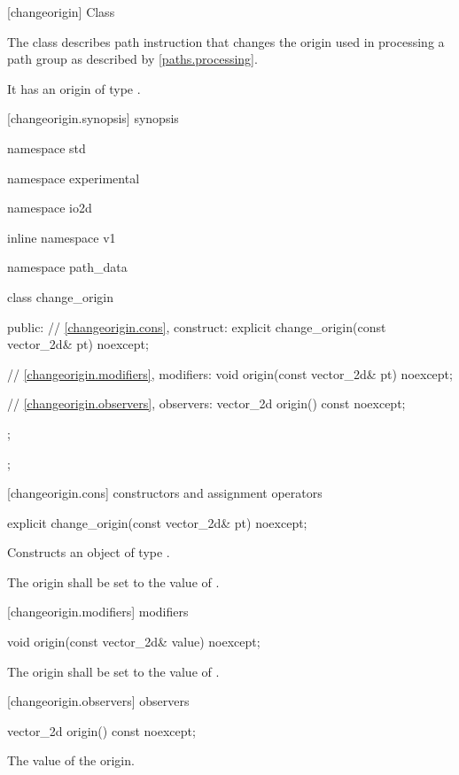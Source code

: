  [changeorigin] {Class }

\pnum
{}
The class  describes path instruction that changes the origin used in processing a path group as described by \ref{paths.processing}.

\pnum
It has an origin of type .

 [changeorigin.synopsis] { synopsis}

\begin{codeblock}
namespace std { namespace experimental { namespace io2d { inline namespace v1 {
  namespace path_data {
    class change_origin {
    public:
      // \ref{changeorigin.cons}, construct:
      explicit change_origin(const vector_2d& pt) noexcept;

      // \ref{changeorigin.modifiers}, modifiers:
      void origin(const vector_2d& pt) noexcept;

      // \ref{changeorigin.observers}, observers:
      vector_2d origin() const noexcept;
    };
  };
} } } }
\end{codeblock}

 [changeorigin.cons] { constructors and assignment operators}

\begin{itemdecl}
    explicit change_origin(const vector_2d& pt) noexcept;
\end{itemdecl}
\begin{itemdescr}
	\pnum
	\effects
	Constructs an object of type .
	
	\pnum
	The origin shall be set to the value of .
\end{itemdescr}

 [changeorigin.modifiers]{ modifiers}

\begin{itemdecl}
    void origin(const vector_2d& value) noexcept;
\end{itemdecl}
\begin{itemdescr}
	\pnum
	\effects
	The origin shall be set to the value of .
\end{itemdescr}

 [changeorigin.observers]{ observers}

\begin{itemdecl}
    vector_2d origin() const noexcept;
\end{itemdecl}
\begin{itemdescr}
	\pnum
	\returns
	The value of the origin.
\end{itemdescr}

